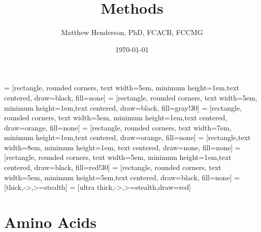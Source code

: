 \documentclass[12pt]{scrartcl}
\author{Matthew Henderson, PhD, FCACB, FCCMG}
\date{\today}
\title{Methods}
\begin{document}
\maketitle
\setcounter{tocdepth}{2}
\tableofcontents


 = [rectangle, rounded corners, text width=5em, minimum height=1em,text centered, draw=black, fill=none]
 = [rectangle, rounded corners, text width=5em, minimum height=1em,text centered, draw=black, fill=gray!30]
 = [rectangle, rounded corners, text width=5em, minimum height=1em,text centered, draw=orange, fill=none]
 = [rectangle, rounded corners, text width=7em, minimum height=1em,text centered, draw=orange, fill=none]
 = [rectangle,text width=8em, minimum height=1em, text centered, draw=none, fill=none]
 = [rectangle, rounded corners, text width=5em, minimum height=1em,text centered, draw=black, fill=red!30]
 = [rectangle, rounded corners, text width=5em, minimum height=5em,text centered, draw=black, fill=none]
 = [thick,->,>=stealth]
 = [ultra thick,->,>=stealth,draw=red]

\section{Amino Acids}
\label{sec:org4667ce7}
\end{document}
